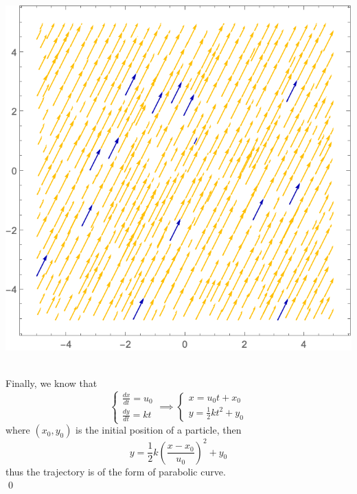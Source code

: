 \documentclass[12pt]{article}
\begin{document}
\begin{minipage}{0.45\textwidth}
  \centering
  \includegraphics[scale=0.5]{images/streamline3.png}
\end{minipage}
\\
\indent Finally, we know that 
$$
    \left\{\begin{matrix}
  \frac{dx}{dt}=u_0 \\
  \frac{dy}{dt}=kt
    \end{matrix}\right. \implies
    \left\{\begin{matrix}
  x=u_0t + x_0\\
  y=\frac{1}{2}kt^2 + y_0
    \end{matrix}\right.
$$ where $(x_0, y_0)$ is the initial position of a particle, then 
$$
    y=\frac{1}{2}k\left(\frac{x-x_0}{u_0}\right)^2+y_0
$$ thus the trajectory is of the form of parabolic curve. \\
\qed
 
\end{document}
